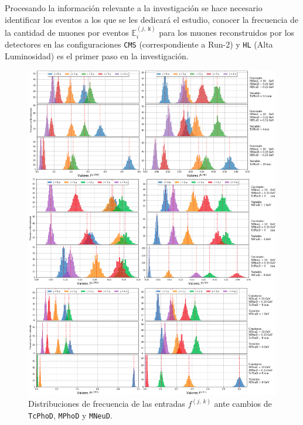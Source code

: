 
Procesando la información relevante a la investigación se hace necesario identificar los eventos a los que se les dedicará el estudio, conocer la frecuencia de la cantidad de muones por eventos $\mathbb{E}_i^{(j,~\mathtt{k})}$ para los muones reconstruidos por los detectores en las configuraciones \texttt{CMS} (correspondiente a Run-2) y \texttt{HL} (Alta Luminosidad) es el primer paso en la investigación.

\begin{figure}[!ht]
\centering
\includegraphics[width=.92\textwidth]{Simulacion/imagenes/Distribucion_EntriesALL.png}
\caption{Distribuciones de frecuencia de las entradas $f^{(j,~k)}$ ante cambios de \texttt{TcPhoD}, \texttt{MPhoD} y  \texttt{MNeuD}.}
\label{entradas}
\end{figure}


